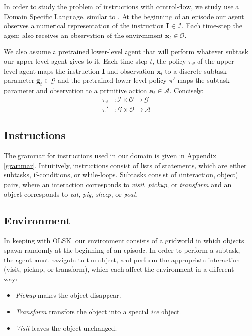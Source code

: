 \documentclass{article}
\begin{document}
In order to study the problem of instructions with control-flow, we
study use a Domain Specific Language, similar to \citet{sun2020program}.
At the beginning of an episode our agent observes a numerical representation of
the instruction $\mathbf{I} \in\mathcal{I}$. Each time-step the agent also receives an observation of the
environment $\mathbf{x}_t \in\mathcal{O}$. 

We also assume a pretrained lower-level agent that will perform whatever subtask our
upper-level agent gives to it. Each time step $t$, the policy $\pi_\theta$ of the upper-level agent
maps the instruction
$\mathbf{I}$ and
observation $\mathbf{x}_t$ to a discrete subtask parameter
$\mathbf{g}_t \in\mathcal{G}$ and the
pretrained lower-level policy $\pi'$ maps the subtask parameter and observation to
a primitive action $\mathbf{a}_t \in \mathcal{A}$. Concisely:
\begin{align}
  \pi_\theta&: \mathcal{I} \times \mathcal{O} \to \mathcal{G} \\
  \pi'&: \mathcal{G} \times \mathcal{O} \to \mathcal{A}
\end{align}

\subsection{Instructions}
The grammar for instructions used in our domain is given in Appendix
\ref{grammar}.
Intuitively, instructions consist of lists of statements, which are either subtasks,
if-conditions, or while-loops. Subtasks consist of (interaction, object) pairs,
where an interaction corresponds to \textit{visit}, \textit{pickup}, or
\textit{transform} and an object corresponds to \textit{cat}, \textit{pig},
\textit{sheep}, or \textit{goat}.

\subsection{Environment}
In keeping with OLSK, our environment consists of a gridworld in which
objects spawn randomly at the beginning of an episode. In order to perform a
subtask, the agent must navigate to the object, and perform the appropriate
interaction (visit, pickup, or transform), which each affect the environment in
a different way:
\begin{itemize}
  \item \textit{Pickup} makes the object disappear. 
  \item \textit{Transform} transfors the object into a special \textit{ice}
    object.
  \item \textit{Visit} leaves the object unchanged.
\end{itemize}
\end{document}
